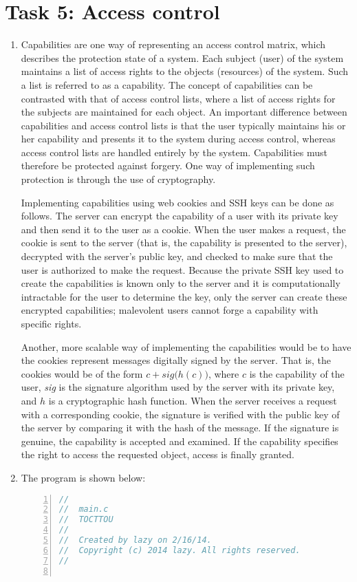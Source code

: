 \section*{Task 5: Access control}
\begin{enumerate}
\item %
  Capabilities are one way of representing an access control matrix, which describes the protection state of a system. Each subject (user) of the system maintains a list of access rights to the objects (resources) of the system. Such a list is referred to as a capability. The concept of capabilities can be contrasted with that of access control lists, where a list of access rights for the subjects are maintained for each object. An important difference between capabilities and access control lists is that the user typically maintains his or her capability and presents it to the system during access control, whereas access control lists are handled entirely by the system. Capabilities must therefore be protected against forgery. One way of implementing such protection is through the use of cryptography.\cite{bishop02}

Implementing capabilities using web cookies and SSH keys can be done as follows. The server can encrypt the capability of a user with its private key and then send it to the user as a cookie. When the user makes a request, the cookie is sent to the server (that is, the capability is presented to the server), decrypted with the server's public key, and checked to make sure that the user is authorized to make the request. Because the private SSH key used to create the capabilities is known only to the server and it is computationally intractable for the user to determine the key, only the server can create these encrypted capabilities; malevolent users cannot forge a capability with specific rights.

Another, more scalable way of implementing the capabilities would be to have the cookies represent messages digitally signed by the server. That is, the cookies would be of the form $c + \textit{sig}\big(h(c)\big)$, where $c$ is the capability of the user, \textit{sig} is the signature algorithm used by the server with its private key, and $h$ is a cryptographic hash function. When the server receives a request with a corresponding cookie, the signature is verified with the public key of the server by comparing it with the hash of the message. If the signature is genuine, the capability is accepted and examined. If the capability specifies the right to access the requested object, access is finally granted.
\item %
The program is shown below:
\begin{lstlisting}[language=C,numbers=left,numberstyle=\tiny,columns=fullflexible,basicstyle=\footnotesize\ttfamily, breaklines=true, breakautoindent=true, breakindent=4em]
//
//  main.c
//  TOCTTOU
//
//  Created by lazy on 2/16/14.
//  Copyright (c) 2014 lazy. All rights reserved.
//


\end{lstlisting}
\end{enumerate}
